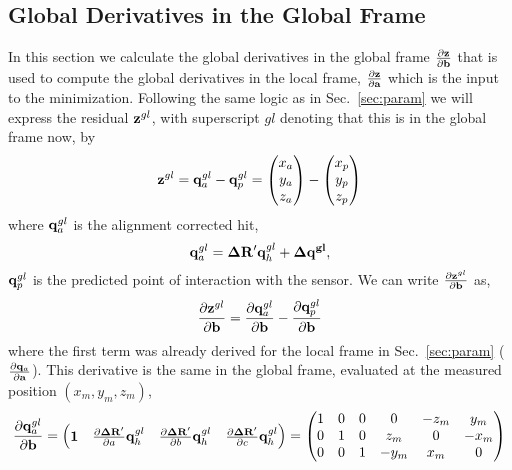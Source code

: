 \documentclass{article}
\def\vec#1{\ensuremath{\mathrm{\bf #1}}}
\def\partder#1#2{\ensuremath{\frac{\partial #1}{\partial #2}}}
\begin{document}
\subsection{Global Derivatives in the Global Frame}
\label{sec:gl_gl}
In this section we calculate the global derivatives in the global frame \partder{\vec{z}}{\vec{b}} that 
is used to compute the global derivatives in the local frame, \partder{\vec{z}}{\vec{a}} which is the 
input to the minimization.  Following the same logic as in Sec.~\ref{sec:param}  we will express the 
residual $\vec{z}^{gl}$, with superscript $gl$ denoting that this is in the global frame now, by 
\[
\vec{z}^{gl} = \vec{q}^{gl}_a - \vec{q}^{gl}_p =
\begin{pmatrix}
x_a \\
y_a \\
z_a
\end{pmatrix}
-
\begin{pmatrix}
x_p \\
y_p \\
z_p
\end{pmatrix}
\]
where $ \vec{q}^{gl}_a$ is the alignment corrected hit, 
\begin{equation}
\vec{q}^{gl}_a  = \vec{\Delta R'}  \vec{q}^{gl}_h + \vec{\Delta q^{gl}}, 
\end{equation}
$\vec{q}^{gl}_p$ is the predicted point of interaction with the sensor.  
We can write \partder{\vec{z}^{gl}}{\vec{b}}  as,
\begin{equation}
\partder{\vec{z}^{gl}}{\vec{b}} =  \partder{\vec{q}^{gl}_a}{\vec{b}} - \partder{\vec{q}^{gl}_p}{\vec{b}} 
\label{eq:derz_derb}
\end{equation}
where the first term was already derived for the local frame in Sec.~\ref{sec:param} (\partder{\vec{q}_a}{\vec{a}}). This derivative is the same in the global frame, evaluated at the measured position $\left( x_m,y_m,z_m \right)$,
\[
\partder{\vec{q}^{gl}_a}{\vec{b}} = 
\begin{pmatrix}
\vec{1} & \partder{\vec{\Delta R}'}{a} \vec{q}^{gl}_h & \partder{\vec{\Delta R}'}{b} \vec{q}^{gl}_h & \partder{\vec{\Delta R}'}{c} \vec{q}^{gl}_h 
\end{pmatrix} 
= 
\begin{pmatrix}
1 & 0 & 0 & 0       & -z_m & y_m  \\
0 & 1 & 0 & z_m & 0        & -x_m \\
0 & 0 & 1 & -y_m  & x_m  & 0        
\end{pmatrix}
\]
 
\end{document}
